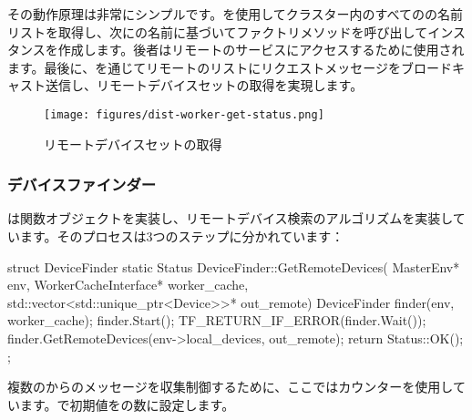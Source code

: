 \begin{content}
その動作原理は非常にシンプルです。を使用してクラスター内のすべてのの名前リストを取得し、次にの名前に基づいてファクトリメソッドを呼び出してインスタンスを作成します。後者はリモートのサービスにアクセスするために使用されます。最後に、を通じてリモートのリストにリクエストメッセージをブロードキャスト送信し、リモートデバイスセットの取得を実現します。

\begin{figure}[H]
\centering
\texttt{[image: figures/dist-worker-get-status.png]}
\caption{リモートデバイスセットの取得}
 \label{fig:dist-worker-get-status}
\end{figure}

\subsubsection{デバイスファインダー}

は関数オブジェクトを実装し、リモートデバイス検索のアルゴリズムを実装しています。そのプロセスは3つのステップに分かれています：

\begin{enum}
\end{enum}

\begin{leftbar}
\begin{c++}
struct DeviceFinder {
  static Status DeviceFinder::GetRemoteDevices(
      MasterEnv* env,
      WorkerCacheInterface* worker_cache,
      std::vector<std::unique_ptr<Device>>* out_remote) {
    DeviceFinder finder(env, worker_cache);
    finder.Start();
    TF_RETURN_IF_ERROR(finder.Wait());
    finder.GetRemoteDevices(env->local_devices, out_remote);
    return Status::OK();
  }
};
\end{c++}
\end{leftbar}

複数のからのメッセージを収集制御するために、ここではカウンターを使用しています。で初期値をの数に設定します。


\end{content}
